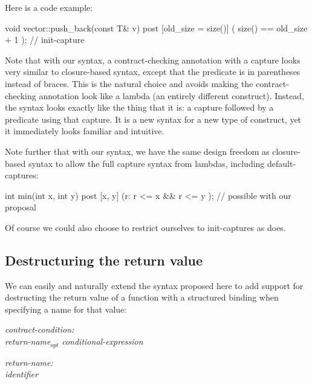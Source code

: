 Here is a code example:

\begin{codeblock}
void vector::push_back(const T& v)
  post [old_size = size()] ( size() == old_size + 1 );  // init-capture
\end{codeblock}

Note that with our syntax, a contract-checking annotation with a capture looks very similar to closure-based syntax, except that the predicate is in parentheses instead of braces. This is the natural choice and avoids making the contract-checking annotation look like a lambda (an entirely different construct). Instead, the syntax looks exactly like the thing that it is: a capture followed by a predicate using that capture. It is a new syntax for a new type of construct, yet it immediately looks familiar and intuitive.

Note further that with our syntax, we have the same design freedom as closure-based syntax \cite{P2461R1} to allow the full capture syntax from lambdas, including default-captures:

\begin{codeblock}
int min(int x, int y)
  post [x, y] (r: r <= x && r <= y );   // possible with our proposal
\end{codeblock}

Of course we could also choose to restrict ourselves to init-captures as \cite{P2935R3} does. 


\subsection{Destructuring the return value}
\label{subsec:struct}

We can easily and naturally extend the syntax proposed here to add support for destructing the return value of a function with a structured binding when specifying a name for that value:

\emph{contract-condition:} \\
\phantom{~~~}\tcode{(} \emph{return-name}$_{opt}$ \emph{conditional-expression} \tcode{)}

\emph{return-name:}\\
\phantom{~~~}\emph{identifier} \tcode{:} \\
\phantom{~~~}

